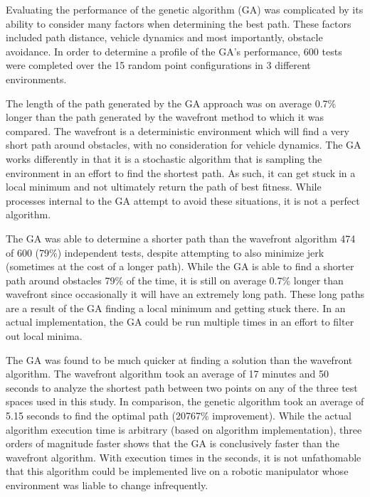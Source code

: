 	

%
Evaluating the performance of the genetic algorithm (GA) was complicated by its ability to consider many factors when determining the best path. These factors included path distance, vehicle dynamics and most importantly, obstacle avoidance. In order to determine a profile of the GA's performance, 600 tests were completed over the 15 random point configurations in 3 different environments.

The length of the path generated by the GA approach was on average 0.7\% longer than the path generated by the wavefront method to which it was compared. The wavefront is a deterministic environment which will find a very short path around obstacles, with no consideration for vehicle dynamics. The GA works differently in that it is a stochastic algorithm that is sampling the environment in an effort to find the shortest path. As such, it can get stuck in a local minimum and not ultimately return the path of best fitness. While processes internal to the GA attempt to avoid these situations, it is not a perfect algorithm.

The GA was able to determine a shorter path than the wavefront algorithm 474 of 600 (79\%) independent tests, despite attempting to also minimize jerk (sometimes at the cost of a longer path). While the GA is able to find a shorter path around obstacles 79\% of the time, it is still on average 0.7\% longer than wavefront since occasionally it will have an extremely long path. These long paths are a result of the GA finding a local minimum and getting stuck there. In an actual implementation, the GA could be run multiple times in an effort to filter out local minima.

The GA was found to be much quicker at finding a solution than the wavefront algorithm. The wavefront algorithm took an average of 17 minutes and 50 seconds to analyze the shortest path between two points on any of the three test spaces used in this study. In comparison, the genetic algorithm took an average of 5.15 seconds to find the optimal path (20767\% improvement). While the actual algorithm execution time is arbitrary (based on algorithm implementation), three orders of magnitude faster shows that the GA is conclusively faster than the wavefront algorithm. With execution times in the seconds, it is not unfathomable that this algorithm could be implemented live on a robotic manipulator whose environment was liable to change infrequently.

